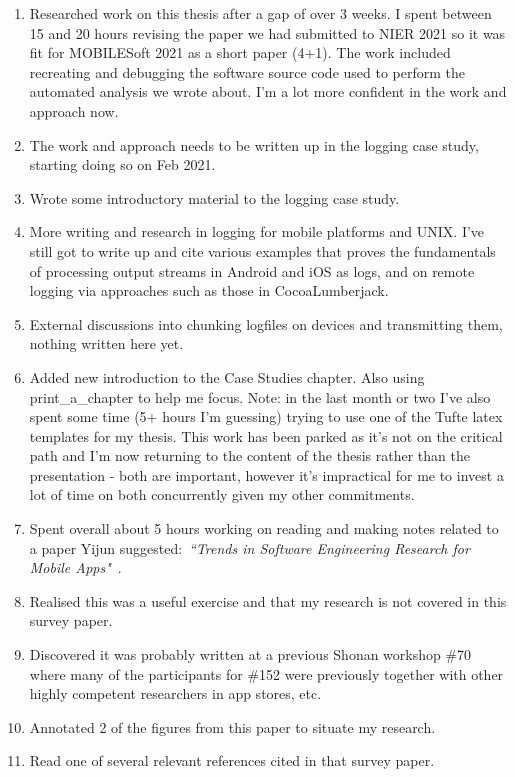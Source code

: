 \begin{enumerate}
    \item Researched work on this thesis after a gap of over 3 weeks. I spent between 15 and 20 hours revising the paper we had submitted to NIER 2021 so it was fit for MOBILESoft 2021 as a short paper (4+1). The work included recreating and debugging the software source code used to perform the automated analysis we wrote about. I'm a lot more confident in the work and approach now. 
    \item The work and approach needs to be written up in the logging case study, starting doing so on  Feb 2021.
    \item Wrote some introductory material to the logging case study.
    \item More writing and research in logging for mobile platforms and UNIX. I've still got to write up and cite various examples that proves the fundamentals of processing output streams in Android and iOS as logs, and on remote logging via approaches such as those in CocoaLumberjack.
    \item External discussions into chunking logfiles on devices and transmitting them, nothing written here yet.
    \item Added new introduction to the Case Studies chapter. Also using print\_a\_chapter to help me focus. Note: in the last month or two I've also spent some time (5+ hours I'm guessing) trying to use one of the Tufte latex templates for my thesis. This work has been parked as it's not on the critical path and I'm now returning to the content of the thesis rather than the presentation - both are important, however it's impractical for me to invest a lot of time on both concurrently given my other commitments.  
    \item Spent overall about 5 hours working on reading and making notes related to a paper Yijun suggested:~\emph{``Trends in Software Engineering Research for Mobile Apps"}~\citep{nagappan2016_future_trends_in_sw_eng_for_mobile_apps}.
    \item Realised this was a useful exercise and that my research is not covered in this survey paper.
    \item Discovered it was probably written at a previous Shonan workshop \#70 where many of the participants for \#152 were previously together with other highly competent researchers in app stores, etc.
    \item Annotated 2 of the figures from this paper to situate my research.
    \item Read one of several relevant references cited in that survey paper.

\end{enumerate}
